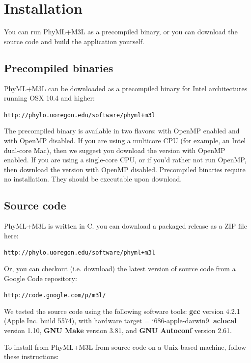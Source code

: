 \documentclass[11pt]{article}
\begin{document}
\pagebreak
\section{Installation}

You can run PhyML+M3L as a precompiled binary, or you can download the source code and build the application yourself.

\subsection{Precompiled binaries}

PhyML+M3L can be downloaded as a precompiled binary for Intel architectures running OSX 10.4 and higher:

\medskip
\texttt{http://phylo.uoregon.edu/software/phyml+m3l}

\medskip
\noindent The precompiled binary is available in two flavors: with OpenMP enabled and with OpenMP disabled.  If you are using a multicore CPU (for example, an Intel dual-core Mac), then we suggest you download the version with OpenMP enabled.  If you are using a single-core CPU, or if you'd rather not run OpenMP, then download the version with OpenMP disabled.  Precompiled binaries require no installation.  They should be executable upon download.

\subsection{Source code}

PhyML+M3L is written in C.  you can download a packaged release as a ZIP file here: 

\medskip
\texttt{http://phylo.uoregon.edu/software/phyml+m3l}

\medskip
\noindent Or, you can checkout (i.e. download) the latest version of source code from a Google Code repository:

\medskip
\texttt{http://code.google.com/p/m3l/}

\medskip
\noindent We tested the source code using the following software tools: \textbf{gcc} version 4.2.1 (Apple Inc. build 5574), with hardware target = i686-apple-darwin9.  \textbf{aclocal} version 1.10, \textbf{GNU Make} version 3.81, and \textbf{GNU Autoconf} version 2.61.

\pagebreak
\noindent To install from PhyML+M3L from source code on a Unix-based machine, follow these instructions:
\end{document}
